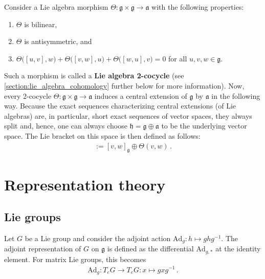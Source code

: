     \begin{construct}\label{lie:cocycle}
        Consider a Lie algebra morphism $\Theta:\mathfrak{g}\times\mathfrak{g}\rightarrow\mathfrak{a}$ with the following properties:
        \begin{enumerate}
            \item $\Theta$ is bilinear,
            \item $\Theta$ is antisymmetric, and
            \item $\Theta\bigl([u,v],w\bigr) + \Theta\bigl([v,w],u\bigr) + \Theta\bigl([w,u],v\bigr) = 0$ for all $u,v,w\in\mathfrak{g}$.
        \end{enumerate}
        Such a morphism is called a \textbf{Lie algebra 2-cocycle} (see \cref{section:lie_algebra_cohomology} further below for more information). Now, every 2-cocycle $\Theta:\mathfrak{g}\times\mathfrak{g}\rightarrow\mathfrak{a}$ induces a central extension of $\mathfrak{g}$ by $\mathfrak{a}$ in the following way. Because the exact sequences characterizing central extensions (of Lie algebras) are, in particular, short exact sequences of vector spaces, they always split and, hence, one can always choose $\mathfrak{h}=\mathfrak{g}\oplus\mathfrak{a}$ to be the underlying vector space. The Lie bracket on this space is then defined as follows:
        \begin{gather}
            [v\oplus\lambda,w\oplus\mu] := [v,w]_{\mathfrak{g}}\oplus\Theta(v,w)\,.
        \end{gather}
    \end{construct}

\section{Representation theory}
\subsection{Lie groups}


    \begin{example}\label{lie:adjoint_representation}
        Let $G$ be a Lie group and consider the adjoint action $\mathrm{Ad}_g:h\mapsto ghg^{-1}$. The adjoint representation of $G$ on $\mathfrak{g}$ is defined as the differential $\mathrm{Ad}_{g,*}$ at the identity element. For matrix Lie groups, this becomes
        \begin{gather}
            \mathrm{Ad}_g:T_eG\rightarrow T_eG:x\mapsto gxg^{-1}\,.
        \end{gather}
    \end{example}

